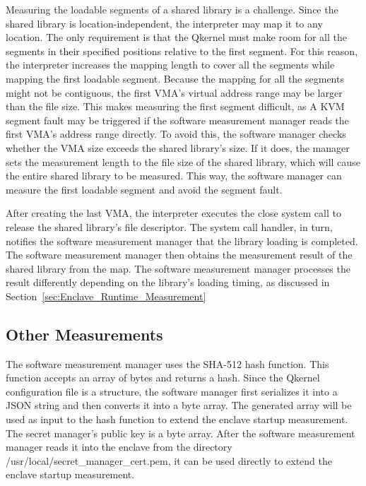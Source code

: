 Measuring the loadable segments of a shared library is a challenge. Since the shared library is location-independent, the interpreter may map it to any location. The only requirement is that the Qkernel must make room for all the segments in their specified positions relative to the first segment. 
For this reason, the interpreter increases the mapping length to cover all the segments while mapping the first loadable segment. Because the mapping for all the segments might not be contiguous, the first VMA's virtual address range may be larger than the file size. This makes measuring the first 
segment difficult, as A KVM segment fault may be triggered if the software measurement manager reads the first VMA's address range directly. To avoid this, the software manager checks whether the VMA size exceeds the shared library's size. If it does, the manager sets the measurement length to the 
file size of the shared library, which will cause the entire shared library to be measured. This way, the software manager can measure the first loadable segment and avoid the segment fault.



After creating the last VMA, the interpreter executes the close system call to release the shared library's file descriptor. The system call handler, in turn, notifies the software measurement manager that the library loading is completed. The software measurement manager then obtains the measurement 
result of the shared library from the map. The software measurement manager processes the result differently depending on the library's loading timing, as discussed in Section~\ref{sec:Enclave_Runtime_Measurement}
\subsection{Other Measurements}
The software measurement manager uses the SHA-512 hash function. This function accepts an array of bytes and returns a hash. Since the Qkernel configuration file is a structure, the software manager first serializes it into a JSON string and then converts it into a byte array. The generated array will 
be used as input to the hash function to extend the enclave startup measurement. The secret manager's public key is a byte array. After the software measurement manager reads it into the enclave from the directory /usr/local/secret\_manager\_cert.pem, it can be used directly to extend the enclave 
startup measurement.

